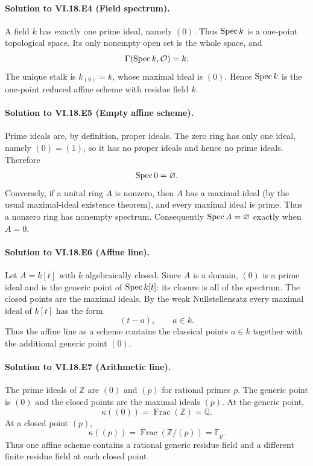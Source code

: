 \paragraph{Solution to VI.18.E4 (Field spectrum).}
\begin{solution}
A field $k$ has exactly one prime ideal, namely $(0)$. Thus $\operatorname{Spec} k$ is a one-point topological space. Its only nonempty open set is the whole space, and
\[
\Gamma(\operatorname{Spec} k,\mathcal O)=k.
\]
The unique stalk is $k_{(0)}=k$, whose maximal ideal is $(0)$. Hence $\operatorname{Spec} k$ is the one-point reduced affine scheme with residue field $k$.
\end{solution}

\paragraph{Solution to VI.18.E5 (Empty affine scheme).}
\begin{solution}
Prime ideals are, by definition, proper ideals. The zero ring has only one ideal, namely $(0)=(1)$, so it has no proper ideals and hence no prime ideals. Therefore
\[
\operatorname{Spec} 0=\varnothing.
\]
Conversely, if a unital ring $A$ is nonzero, then $A$ has a maximal ideal (by the usual maximal-ideal existence theorem), and every maximal ideal is prime. Thus a nonzero ring has nonempty spectrum. Consequently $\operatorname{Spec} A=\varnothing$ exactly when $A=0$.
\end{solution}

\paragraph{Solution to VI.18.E6 (Affine line).}
\begin{solution}
Let $A=k[t]$ with $k$ algebraically closed. Since $A$ is a domain, $(0)$ is a prime ideal and is the generic point of $\operatorname{Spec} k[t]$: its closure is all of the spectrum.  The closed points are the maximal ideals. By the weak Nullstellensatz every maximal ideal of $k[t]$ has the form
\[
(t-a),\qquad a\in k.
\]
Thus the affine line as a scheme contains the classical points $a\in k$ together with the additional generic point $(0)$.
\end{solution}

\paragraph{Solution to VI.18.E7 (Arithmetic line).}
\begin{solution}
The prime ideals of $\mathbb Z$ are $(0)$ and $(p)$ for rational primes $p$. The generic point is $(0)$ and the closed points are the maximal ideals $(p)$.  At the generic point,
\[
\kappa((0))=\operatorname{Frac}(\mathbb Z)=\mathbb Q.
\]
At a closed point $(p)$,
\[
\kappa((p))=\operatorname{Frac}(\mathbb Z/(p))=\mathbb F_p.
\]
Thus one affine scheme contains a rational generic residue field and a different finite residue field at each closed point.
\end{solution}

